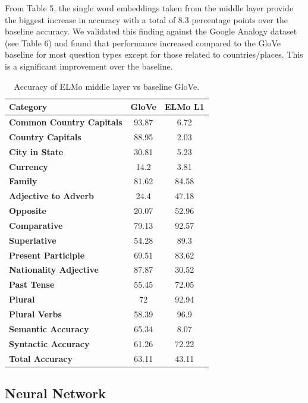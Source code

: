 \documentclass[11pt]{article}
\begin{document}
From Table 5, the single word embeddings taken from the middle layer provide the
biggest increase in accuracy with a total of 8.3 percentage points over the
baseline accuracy. We validated this finding against the Google Analogy dataset
(see Table 6) and found that performance increased compared to the GloVe
baseline for most question types except for those related to countries/places.
This is a significant improvement over the baseline.

\begin{table}[h]
\begin{center}
\begin{tabular}{|l|cc|}
\hline\bf Category & GloVe & ELMo L1 \\\hline
\bf Common Country Capitals & 93.87 & 6.72 \\
\bf Country Capitals & 88.95 & 2.03 \\
\bf City in State & 30.81 & 5.23 \\
\bf Currency & 14.2 & 3.81 \\
\bf Family & 81.62 & 84.58 \\
\bf Adjective to Adverb & 24.4 & 47.18 \\
\bf Opposite & 20.07 & 52.96 \\
\bf Comparative & 79.13 & 92.57 \\
\bf Superlative & 54.28 & 89.3 \\
\bf Present Participle & 69.51 & 83.62 \\
\bf Nationality Adjective & 87.87 & 30.52 \\
\bf Past Tense & 55.45 & 72.05 \\
\bf Plural & 72 & 92.94 \\
\bf Plural Verbs & 58.39 & 96.9 \\
\bf Semantic Accuracy & 65.34 & 8.07 \\
\bf Syntactic Accuracy & 61.26 & 72.22 \\
\bf Total Accuracy & 63.11 & 43.11 \\\hline
\end{tabular}
\end{center}
\caption{\label{font-table} Accuracy of ELMo middle layer vs baseline GloVe.}
\end{table}


\subsection{Neural Network}
\end{document}
